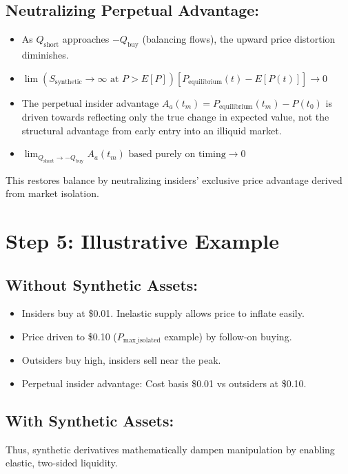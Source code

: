 \documentclass{article}
\begin{document}
\subsection*{Neutralizing Perpetual Advantage:}
\begin{itemize}
    \item As $Q_{\text{short}}$ approaches $-Q_{\text{buy}}$ (balancing flows), the upward price distortion diminishes.
    \item $\lim (S_{\text{synthetic}} \to \infty \text{ at } P > E[P]) [P_{\text{equilibrium}}(t) - E[P(t)]] \to 0$
    \item The perpetual insider advantage $A_a(t_m) = P_{\text{equilibrium}}(t_m) - P(t_0)$ is driven towards reflecting only the true change in expected value, not the structural advantage from early entry into an illiquid market.
    \item $\lim_{Q_{\text{short}} \to -Q_{\text{buy}}} A_a(t_m) \text{ based purely on timing} \to 0$
\end{itemize}
This restores balance by neutralizing insiders' exclusive price advantage derived from market isolation.

\section{Step 5: Illustrative Example}

\subsection*{Without Synthetic Assets:}
\begin{itemize}
    \item Insiders buy at \$0.01. Inelastic supply allows price to inflate easily.
    \item Price driven to \$0.10 ($P_{\text{max\_isolated}}$ example) by follow-on buying.
    \item Outsiders buy high, insiders sell near the peak.
    \item Perpetual insider advantage: Cost basis \$0.01 vs outsiders at \$0.10.
\end{itemize}

\subsection*{With Synthetic Assets:}
Thus, synthetic derivatives mathematically dampen manipulation by enabling elastic, two-sided liquidity.
\end{document}
